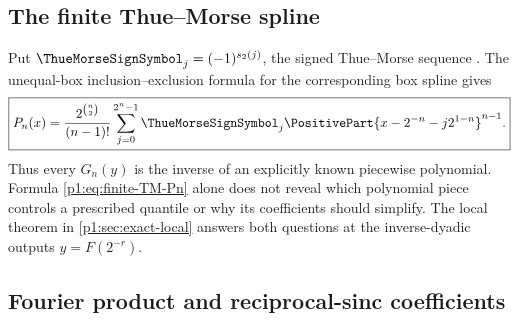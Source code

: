 \documentclass[11pt,oneside]{article}
\numberwithin{equation}{section}
\theoremstyle{definition}
\theoremstyle{remark}
\newcommand{\Fn}{P_n}
\newcommand{\Gn}{G_n}
\begin{document}
\subsection{The finite Thue--Morse spline}

Put $\ThueMorseSignSymbol_j=(-1)^{s_2(j)}$, the signed Thue--Morse sequence \cite{p1:AlloucheShallit}.  The unequal-box inclusion--exclusion formula for the corresponding box spline \cite{p1:deBoorSplines} gives
\begin{equation}
 \boxed{
 \Fn(x)=\frac{2^{\binom n2}}{(n-1)!}
 \sum_{j=0}^{2^n-1}\ThueMorseSignSymbol_j
 \PositivePart{x-2^{-n}-j2^{1-n}}^{n-1}.}
 \label{p1:eq:finite-TM-Pn}
\end{equation}
Thus every $\Gn(y)$ is the inverse of an explicitly known piecewise polynomial.  Formula
\eqref{p1:eq:finite-TM-Pn} alone does not reveal which polynomial piece controls a prescribed
quantile or why its coefficients should simplify.  The local theorem in \cref{p1:sec:exact-local}
answers both questions at the inverse-dyadic outputs $y=F(2^{-r})$.

\subsection{Fourier product and reciprocal-sinc coefficients}
\end{document}
